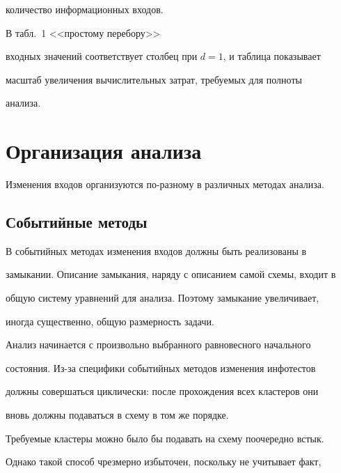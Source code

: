 количество информационных входов. 





В табл.~1 <<простому перебору>> 


входных значений соответствует столбец при $d = 1$, и таблица показывает 


масштаб увеличения вычислительных затрат, требуемых для полноты 


анализа. 





\section{Организация анализа}





Изменения входов организуются по-разному в различных методах анализа.





\subsection{Событийные методы} %





В событийных методах изменения входов должны быть реализованы в 


замыкании. Описание замыкания, наряду с описанием самой схемы, входит в 


общую систему уравнений для анализа. Поэтому замыкание увеличивает, 


иногда существенно, общую размерность задачи.





Анализ начинается с произвольно выбранного равновесного начального 


состояния. Из-за специфики событийных методов изменения инфотестов 


должны совершаться циклически: после прохождения всех кластеров они 


вновь должны подаваться в схему в том же порядке.





Требуемые кластеры можно было бы подавать на схему поочередно встык. 


Однако такой способ чрезмерно избыточен, поскольку не учитывает факт, 


